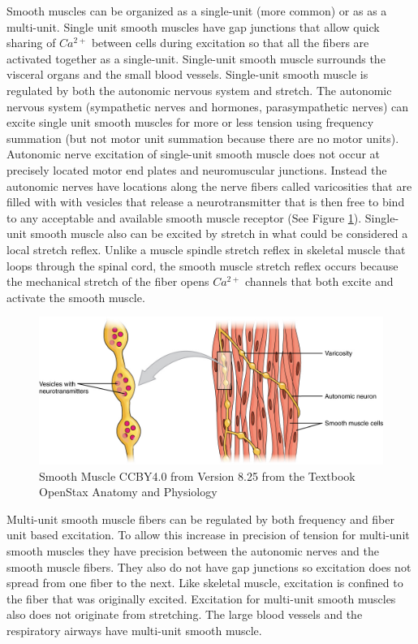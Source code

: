 Smooth muscles can be organized as a single-unit (more common) or as as a multi-unit.
Single unit smooth muscles have gap junctions that allow quick sharing of $Ca^{2+}$ between cells during excitation so that all the fibers are activated together as a single-unit. Single-unit smooth muscle surrounds the visceral organs and the small blood vessels. Single-unit smooth muscle is regulated by both the autonomic nervous system and stretch. The autonomic nervous system (sympathetic nerves and hormones, parasympathetic nerves) can excite single unit smooth muscles for more or less tension using frequency summation (but not motor unit summation because there are no motor units). Autonomic nerve excitation of single-unit smooth muscle does not occur at precisely located motor end plates and neuromuscular junctions. Instead the autonomic nerves have locations along the nerve fibers called varicosities that are filled with with vesicles that release a neurotransmitter that is then free to bind to any acceptable and available smooth muscle receptor (See Figure \ref{fig:Smooth_Muscle}). Single-unit smooth muscle also can be excited by stretch in what could be considered a local stretch reflex. Unlike a muscle spindle stretch reflex in skeletal muscle that loops through the spinal cord, the smooth muscle stretch reflex occurs because the mechanical stretch of the fiber opens $Ca^{2+}$ channels that both excite and activate the smooth muscle.

\begin{figure}[!h]
    \centering
    \includegraphics[width=0.5\linewidth]{./figure/Smooth_Muscle.jpg}
    \caption{Smooth Muscle \footnotesize{CCBY4.0 from Version 8.25 from the Textbook OpenStax Anatomy and Physiology}}
    \label{fig:Smooth_Muscle}
\end{figure}

Multi-unit smooth muscle fibers can be regulated by both frequency and fiber unit based excitation. To allow this increase in precision of tension for multi-unit smooth muscles they have precision between the autonomic nerves and the smooth muscle fibers. They also do not have gap junctions so excitation does not spread from one fiber to the next. Like skeletal muscle, excitation is confined to the fiber that was originally excited. Excitation for multi-unit smooth muscles also does not originate from stretching. The large blood vessels and the respiratory airways have multi-unit smooth muscle.

